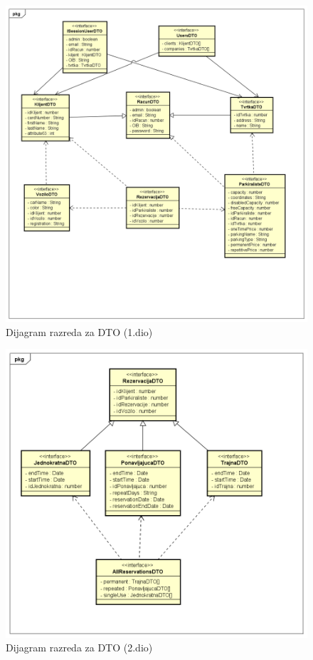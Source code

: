     	\begin{figure}[H]
	    	\includegraphics[width=1\linewidth]{dijagrami/Dijagram razreda - DTO_1.png}
	    	\caption{Dijagram razreda za DTO (1.dio)}
	    	\label{fig:Dijagram razreda - DTO1} 
	   	 \end{figure}
	   	 
	   	 \begin{figure}[H]
	    	\includegraphics[width=1\linewidth]{dijagrami/Dijagram razreda - DTO_2.png}
	    	\caption{Dijagram razreda za DTO (2.dio)}
	    	\label{fig:Dijagram razreda - DTO2} 
	   	 \end{figure}
    
